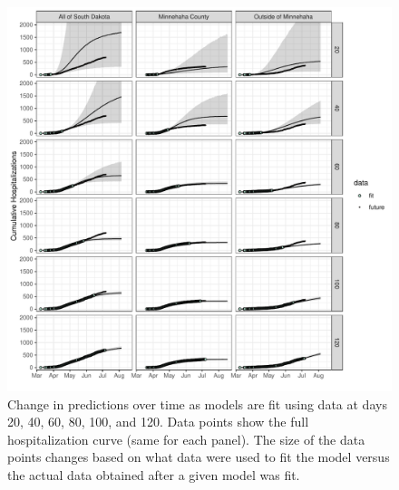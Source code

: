\documentclass[
]{article}
\begin{document}
\begin{figure}
\centering
\includegraphics{manuscript_files/figure-latex/unnamed-chunk-4-1.pdf}
\caption{\label{fig:unnamed-chunk-4}Change in predictions over time as models are fit using data at days 20, 40, 60, 80, 100, and 120. Data points show the full hospitalization curve (same for each panel). The size of the data points changes based on what data were used to fit the model versus the actual data obtained after a given model was fit.\label{pred_overtime:plot}}
\end{figure}
\end{document}

